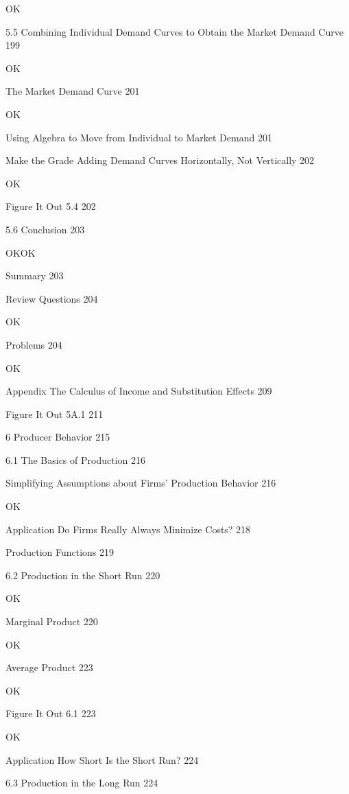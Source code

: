 OK

5.5 Combining Individual Demand Curves to Obtain the Market Demand Curve 199

OK

The Market Demand Curve 201

OK

Using Algebra to Move from Individual to Market Demand 201



Make the Grade Adding Demand Curves Horizontally, Not Vertically 202

OK

Figure It Out 5.4 202



5.6 Conclusion 203

OKOK

Summary 203



Review Questions 204

OK

Problems 204

OK

Appendix The Calculus of Income and Substitution Effects 209



Figure It Out 5A.1 211



6 Producer Behavior 215



6.1 The Basics of Production 216



Simplifying Assumptions about Firms' Production Behavior 216

OK

Application Do Firms Really Always Minimize Costs? 218



Production Functions 219



6.2 Production in the Short Run 220

OK

Marginal Product 220

OK

Average Product 223

OK

Figure It Out 6.1 223

OK

Application How Short Is the Short Run? 224



6.3 Production in the Long Run 224

